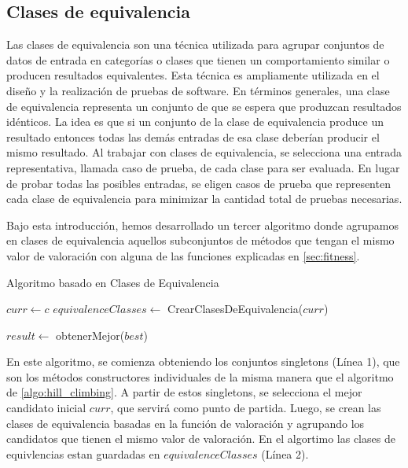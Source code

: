 \subsection{Clases de equivalencia}
\label{alg:approachCE}
 Las clases de equivalencia son una técnica utilizada para agrupar conjuntos de datos de entrada en categorías o clases que tienen un comportamiento similar o producen resultados equivalentes. Esta técnica es ampliamente utilizada en el diseño y la realización de pruebas de software.
 En términos generales, una clase de equivalencia representa  un conjunto de que se espera que produzcan resultados idénticos. La idea es que si un conjunto de la clase de equivalencia produce un resultado entonces todas las demás entradas de esa clase deberían producir el mismo resultado.
 Al trabajar con clases de equivalencia, se selecciona una entrada representativa, llamada caso de prueba, de cada clase para ser evaluada. En lugar de probar todas las posibles entradas, se eligen casos de prueba que representen cada clase de equivalencia para minimizar la cantidad total de pruebas necesarias.

 Bajo esta introducción, hemos desarrollado un tercer algoritmo donde agrupamos en clases de equivalencia aquellos subconjuntos de métodos que tengan el mismo valor de valoración con alguna de las funciones explicadas en \ref{sec:fitness}.


\begin{algorithm}[H]
  \caption{Algoritmo basado en Clases de Equivalencia}
  \label{algo:clases_equivalencia}
  \SetAlgoLined
  $curr \gets c$\; 
  $equivalenceClasses \gets$ CrearClasesDeEquivalencia($curr$)\;
  
  
  $result \gets$ obtenerMejor($best$)\;
  \;
\end{algorithm}

En este algoritmo, se comienza obteniendo los conjuntos singletons (Línea 1), que son los métodos constructores individuales de la misma manera que el algoritmo de \ref{algo:hill_climbing}. A partir de estos singletons, se selecciona el mejor candidato inicial $curr$, que servirá como punto de partida. Luego, se crean las clases de equivalencia basadas en la función de valoración y agrupando los candidatos que tienen el mismo valor de valoración. En el algortimo las clases de equivlencias estan guardadas en $equivalenceClasses$ (Línea 2).


